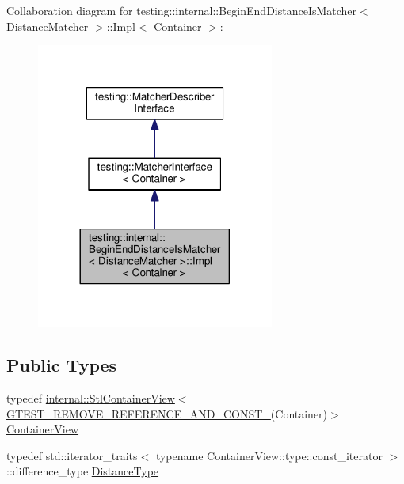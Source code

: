 Collaboration diagram for testing\+:\+:internal\+:\+:Begin\+End\+Distance\+Is\+Matcher$<$ Distance\+Matcher $>$\+:\+:Impl$<$ Container $>$\+:
\nopagebreak
\begin{figure}[H]
\begin{center}
\leavevmode
\includegraphics[width=221pt]{classtesting_1_1internal_1_1BeginEndDistanceIsMatcher_1_1Impl__coll__graph}
\end{center}
\end{figure}
\subsection*{Public Types}
\begin{DoxyCompactItemize}
\item 
typedef \hyperlink{classtesting_1_1internal_1_1StlContainerView}{internal\+::\+Stl\+Container\+View}$<$ \hyperlink{gtest-internal_8h_a874567b176266188fabfffb8393267ce}{G\+T\+E\+S\+T\+\_\+\+R\+E\+M\+O\+V\+E\+\_\+\+R\+E\+F\+E\+R\+E\+N\+C\+E\+\_\+\+A\+N\+D\+\_\+\+C\+O\+N\+S\+T\+\_\+}(Container)$>$ \hyperlink{classtesting_1_1internal_1_1BeginEndDistanceIsMatcher_1_1Impl_a5c76ede38c6143430f56e02e9024f535}{Container\+View}
\item 
typedef std\+::iterator\+\_\+traits$<$ typename Container\+View\+::type\+::const\+\_\+iterator $>$\+::difference\+\_\+type \hyperlink{classtesting_1_1internal_1_1BeginEndDistanceIsMatcher_1_1Impl_a10d901c49e2793dae6bcce6fa1a4e9fe}{Distance\+Type}
\end{DoxyCompactItemize}
